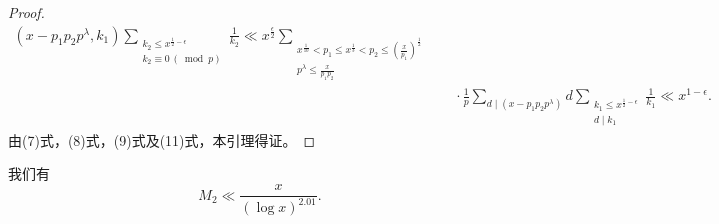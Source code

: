 \begin{proof}
\begin{align*}
(x-p_1p_2p^\lambda,k_1)\sum_{\substack{k_2\leqslant x^{\frac12-\epsilon}\\k_2\equiv0\,(\bmod p)}}\frac1{k_2}
\ll x^{\frac{\epsilon}2}\sum_{\substack{x^{\frac1{10}}<p_1\leqslant x^{\frac13}<p_2\leqslant(\frac{x}{p_1})^{\frac12}\\p^\lambda\leqslant\frac{x}{p_1p_2}}}\\
&\quad\cdot\frac1p\sum_{d\mid(x-p_1p_2p^\lambda)}d\sum_{\substack{k_1\leqslant x^{\frac12-\epsilon}\\d\mid k_1}}\frac1{k_1}\ll x^{1-\epsilon}.\tag{11}
\end{align*}
由(7)式，(8)式，(9)式及(11)式，本引理得证。
\end{proof}

\begin{lemma}
我们有
\[
M_2\ll\frac{x}{(\log x)^{2.01}}.
\]
\end{lemma}

